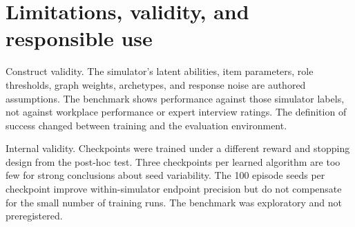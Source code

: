 \documentclass{ieeeaccess}
\begin{document}
\begin{table}[t]\centering\small

\caption{Table 10. Paired weighted-RMSE difference versus MaxEIG}


\end{table}

\section{Limitations, validity, and responsible use}

Construct validity. The simulator's latent abilities, item parameters, role thresholds, graph weights, archetypes, and response noise are authored assumptions. The benchmark shows performance against those simulator labels, not against workplace performance or expert interview ratings. The definition of success changed between training and the evaluation environment.

Internal validity. Checkpoints were trained under a different reward and stopping design from the post-hoc test. Three checkpoints per learned algorithm are too few for strong conclusions about seed variability. The 100 episode seeds per checkpoint improve within-simulator endpoint precision but do not compensate for the small number of training runs. The benchmark was exploratory and not preregistered.
\end{document}

